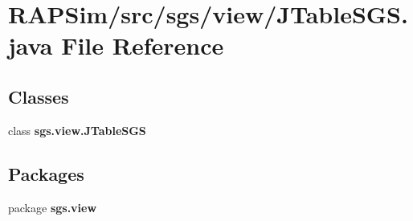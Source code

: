 \section{R\-A\-P\-Sim/src/sgs/view/\-J\-Table\-S\-G\-S.java File Reference}
\label{_j_table_s_g_s_8java}
\subsection*{Classes}
\begin{DoxyCompactItemize}
\item 
class {\bf sgs.\-view.\-J\-Table\-S\-G\-S}
\end{DoxyCompactItemize}
\subsection*{Packages}
\begin{DoxyCompactItemize}
\item 
package {\bf sgs.\-view}
\end{DoxyCompactItemize}
